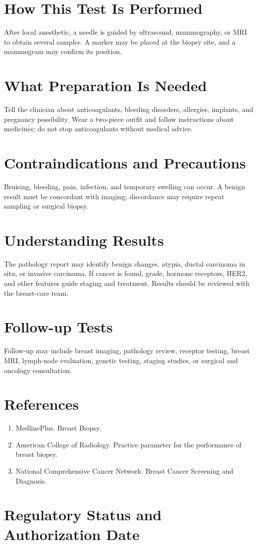 \section*{How This Test Is Performed}
After local anesthetic, a needle is guided by ultrasound, mammography, or MRI to obtain several samples. A marker may be placed at the biopsy site, and a mammogram may confirm its position.

\section*{What Preparation Is Needed}
Tell the clinician about anticoagulants, bleeding disorders, allergies, implants, and pregnancy possibility. Wear a two-piece outfit and follow instructions about medicines; do not stop anticoagulants without medical advice.

\section*{Contraindications and Precautions}
Bruising, bleeding, pain, infection, and temporary swelling can occur. A benign result must be concordant with imaging; discordance may require repeat sampling or surgical biopsy.

\section*{Understanding Results}
The pathology report may identify benign changes, atypia, ductal carcinoma in situ, or invasive carcinoma. If cancer is found, grade, hormone receptors, HER2, and other features guide staging and treatment. Results should be reviewed with the breast-care team.

\section*{Follow-up Tests}
Follow-up may include breast imaging, pathology review, receptor testing, breast MRI, lymph-node evaluation, genetic testing, staging studies, or surgical and oncology consultation.

\section*{References}
\begin{enumerate}
  \item MedlinePlus. Breast Biopsy.
  \item American College of Radiology. Practice parameter for the performance of breast biopsy.
  \item National Comprehensive Cancer Network. Breast Cancer Screening and Diagnosis.
\end{enumerate}

\clearpage


\section*{Regulatory Status and Authorization Date}

\clearpage
